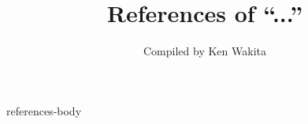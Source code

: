 \documentclass [autodetect-engine, dvipdfmx, a4j] {jsarticle}
\title {References of ``...''}
\author {Compiled by Ken Wakita}
\begin{document}
\maketitle

\tableofcontents

 {references-body}
\end{document}
